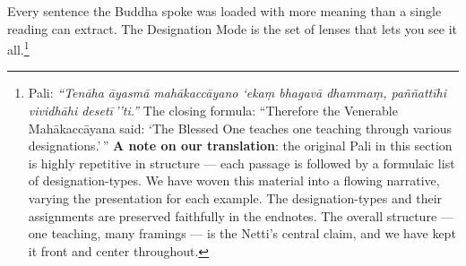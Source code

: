 Every sentence the Buddha spoke was loaded with more meaning than a single reading can extract. The Designation Mode is the set of lenses that lets you see it all.\footnote{Pali: \textit{``Tenāha āyasmā mahākaccāyano `ekaṃ bhagavā dhammaṃ, paññattīhi vividhāhi desetī\,''ti.''} The closing formula: ``Therefore the Venerable Mahākaccāyana said: `The Blessed One teaches one teaching through various designations.'\,'' \textbf{A note on our translation}: the original Pali in this section is highly repetitive in structure --- each passage is followed by a formulaic list of designation-types. We have woven this material into a flowing narrative, varying the presentation for each example. The designation-types and their assignments are preserved faithfully in the endnotes. The overall structure --- one teaching, many framings --- is the Netti's central claim, and we have kept it front and center throughout.}
